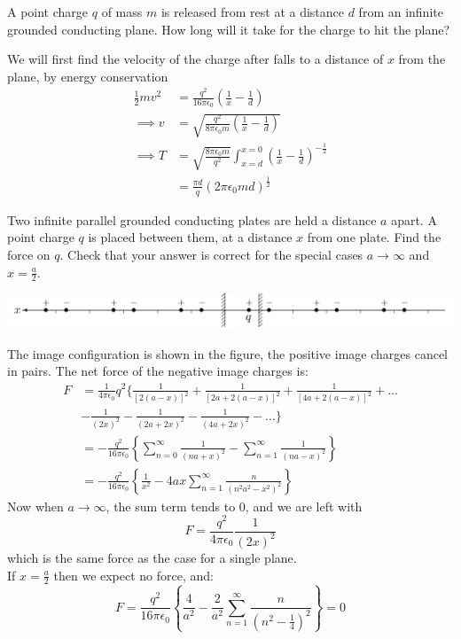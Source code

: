 \documentclass[../main.tex]{subfiles}
\begin{document}
\begin{questions}
\question A point charge $q$ of mass $m$ is released from rest at a distance $d$ from an infinite grounded conducting plane. How long will it take for the charge to hit the plane?
\begin{solution}
	We will first find the velocity of the charge after falls to a distance of $x$ from the plane, by energy conservation
	\begin{align*}
		\frac{1}{2}mv^2 &= \frac{q^2}{16\pi\epsilon_0} \left( \frac{1}{x} - \frac{1}{d} \right) \\
		\implies v &= \sqrt{\frac{q^2}{8\pi\epsilon_0m} \left( \frac{1}{x} - \frac{1}{d} \right)} \\
		\implies T &= \sqrt{\frac{8\pi\epsilon_0m}{q^2}}\int^{x=0}_{x=d} \left( \frac{1}{x} - \frac{1}{d} \right)^{-\frac{1}{2}} \\
		&= \frac{\pi d}{q}(2\pi\epsilon_0md)^{\frac{1}{2}}
	\end{align*}
\end{solution}


\question Two infinite parallel grounded conducting plates are held a distance $a$ apart. A point charge $q$ is placed between them, at a distance $x$ from one plate. Find the force on $q$. Check that your answer is correct for the special cases $a \to \infty$ and $x = \frac{a}{2}$.
\begin{solution}
	\begin{center}
		\includegraphics[width=\textwidth]{assets/grif3-39.png}
	\end{center}
	The image configuration is shown in the figure, the positive image charges cancel in pairs. The net force of the negative image charges is:
	\begin{align}
		F &= \frac{1}{4\pi\epsilon_0}q^2\Biggr\{ \frac{1}{[2(a-x)]^2} + \frac{1}{[2a + 2(a-x)]^2} + \frac{1}{[4a + 2(a-x)]^2} + \hdots\\
		& -\frac{1}{(2x)^2} - \frac{1}{(2a + 2x)^2} - \frac{1}{(4a + 2x)^2} - \hdots \Biggr\} \\
		&= -\frac{q^2}{16\pi\epsilon_0}\left\{ \sum^\infty_{n=0} \frac{1}{(na+x)^2} - \sum^\infty_{n=1}\frac{1}{(na-x)^2} \right\} \\
		&= -\frac{q^2}{16\pi\epsilon_0}\left\{ \frac{1}{x^2} - 4ax\sum^{\infty}_{n=1} \frac{n}{(n^2a^2-x^2)^2} \right\}
	\end{align}
	Now when $a\to\infty$, the sum term tends to $0$, and we are left with
	\begin{equation}
		F = \frac{q^2}{4\pi\epsilon_0}\frac{1}{(2x)^2}
	\end{equation}
	which is the same force as the case for a single plane. \\
	If $x=\frac{a}{2}$ then we expect no force, and:
	\begin{equation}
		F = \frac{q^2}{16\pi\epsilon_0}\left\{ \frac{4}{a^2} - \frac{2}{a^2}\sum^\infty_{n=1}\frac{n}{\left(n^2-\frac{1}{4}\right)^2} \right\} = 0
	\end{equation}
\end{solution}


\end{questions}
\end{document}
